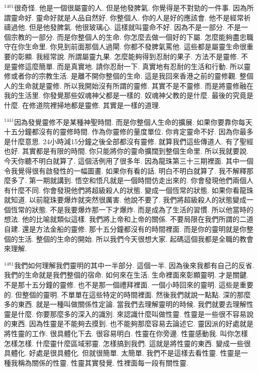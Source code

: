 \documentclass{book}
\begin{document}
$^{1401}$很奇怪.
他是一個很屬靈的人.
但是他發脾氣.
你覺得是不對勁的一件事.
因為所謂靈命好.
靈命好就是人品自然好.
你整個人.
你的人是好的應該會.
他不是經常祈禱過他.
但是他發脾氣.
他很玻璃心.
這樣就叫靈命不好.
因為不是一部分.
不是一個宗教的一部分.
而是你整個人的生命.
你怎麼去做一個好的下屬.
怎麼能夠盡忠職守在你生命里.
你見到前面那個人過閘.
你都不發脾氣罵他.
這些都是屬靈生命很重要的彰顯.
我經常說.
所謂屬靈九果.
怎麼能夠得到忍耐的果子.
方法不是靈修.
不是靈修這麼簡單.
而是真實地.
請你忍耐一下.
真實地有忍耐的生活和行動.
所以靈修或者你的宗教生活.
是離不開你整個的生命.
這是我回來香港之前的靈修觀.
整個人的生命就是靈修.
所以我開始沒有所謂的靈修.
其實不是不靈修.
而是將靈修融在我的生活里.
你發覺那些奴魂神父都是一樣的.
奴魂神父教的是什麼.
最後的究竟是什麼.
在修道院裡掃地都是靈修.
其實是一樣的道理.

$^{1441}$因為發覺靈修不是某種神聖時間.
而是你整個人生命的擴展.
如果你要靠你每天十五分鐘都沒有的靈修時間.
作為你靈修的量度單位.
你肯定靈命不好.
因為你最多是什麼意思.
24小時減15分鐘之後全部都沒有靈修.
就算我們這些傳道人.
有了聖經也好.
其實都是有限的時間.
你只能將你的靈命擴闊到整個生命里.
所以我就要說.
今天你聽不明白就算了.
這個活例用了很多年.
因為龍珠第三十三期裡面.
其中一個令我覺得很有啟發性的一幅圖畫.
如果你有看的話.
明白不明白就算了.
我不解釋那麼多了.
第一期就講到.
悟空和悟凡就是一個時間仿走出來的.
你會發現他們兩個人有什麼不同.
你會發現他們將超級殺人的狀態.
變成一個恆常的狀態.
如果你看龍珠就知道.
以前龍珠要爆炸就突然很厲害.
他說不要了.
我們將超級殺人的狀態變成一個恆常的狀態.
不是我要爆炸那一下才爆炸.
而是成為了生活的習慣.
所以他當時的想法.
他的比喻就類似這樣.
我們將上帝和上帝的關係.
不要局限在我們所謂的二道自建.
還是方法金船的靈修.
那十五分鐘都沒有的時間裡面.
而是你的靈明就是你整個的生活.
整個的生命的開始.
所以我們今天很想大家.
起碼這個我都是全職的教會來理解.

$^{1481}$我們如何理解我們靈明的其中一半部分.
這個一半.
因為後來我都有自己的反省.
我們的生命就是我們整個的宿命.
如何來在生活.
生命裡面來彰顯靈明.
才是關鍵.
不是那十五分鐘的靈修.
也不是那一個禮拜裡面.
一個小時回來的靈明.
這些是重要的.
但整個的靈明.
不單單在這些特定的時間裡面.
然後我們就說一點點.
深的那麼多的東西.
就是一種叫做關係性定論.
當我們去理解靈明的時候.
我們就要去理解性靈是什麼.
你要那麼多的深入的識別.
來認識什麼叫做性靈.
性靈是一些很不容易說的東西.
因為性靈是不能夠去摸到.
也不能夠那麼容易去論述它.
靈因派的好處就是將性靈的工作.
很具體化下去.
很容易明白.
性靈在你旁邊.
性靈感動我.
叫你怎樣怎樣怎樣.
什麼靈什麼區域邪靈.
怎樣搞到我們.
這就是將性靈的東西.
變成一些很具體化.
好處是很具體化.
但就很簡單.
太簡單.
我們不是這樣去看性靈.
性靈是一種我稱為關係的性靈.
性靈其實發覺.
性裡面每一段有關性靈.
\end{document}
